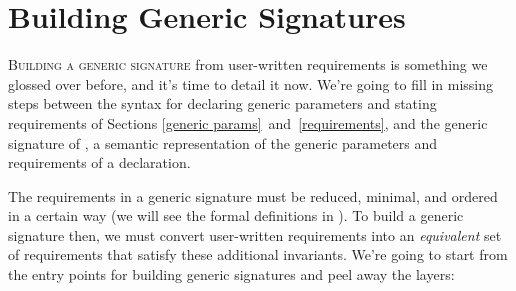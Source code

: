 \documentclass[../generics]{subfiles}
\begin{document}
\chapter{Building Generic Signatures}\label{building generic signatures}

\lettrine{B}{uilding a generic signature} from user-written requirements is something we glossed over before, and it's time to detail it now. We're going to fill in missing steps between the syntax for declaring generic parameters and stating requirements of Sections \ref{generic params}~and~\ref{requirements}, and the generic signature of , a semantic representation of the generic parameters and requirements of a declaration.

The requirements in a generic signature must be reduced, minimal, and ordered in a certain way (we will see the formal definitions in ). To build a generic signature then, we must convert user-written requirements into an \emph{equivalent} set of requirements that satisfy these additional invariants. We're going to start from the entry points for building generic signatures and peel away the layers:
\end{document}
